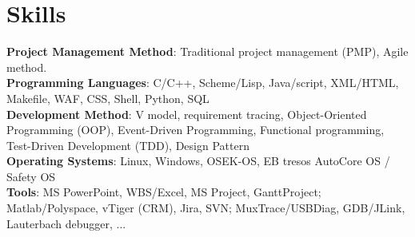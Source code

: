 
\section{Skills}
\textbf{Project Management Method}: Traditional project management (PMP), Agile method.\\

\textbf{Programming Languages}: C/C++, Scheme/Lisp, Java/script, XML/HTML, Makefile, WAF, CSS, Shell, Python, SQL\\

\textbf{Development Method}:
V model, requirement tracing,
Object-Oriented Programming (OOP),
Event-Driven Programming,
Functional programming,
Test-Driven Development (TDD),
Design Pattern\\

\textbf{Operating Systems}: Linux, Windows, OSEK-OS, EB tresos AutoCore OS / Safety OS \\

\textbf{Tools}:
MS PowerPoint,
WBS/Excel, MS Project, GanttProject;
Matlab/Polyspace,
vTiger (CRM), Jira, SVN;
MuxTrace/USBDiag, GDB/JLink, Lauterbach debugger, ...


